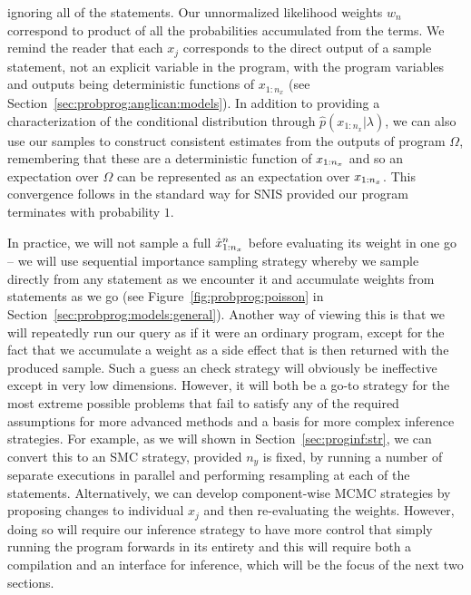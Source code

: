 ignoring all of the \observe statements.  Our unnormalized likelihood weights $w_n$ correspond to
product of all the probabilities accumulated from the \observe terms.  We remind the reader that each 
$x_j$ corresponds to the direct output of a sample statement, not an explicit variable in the program, 
with the program variables and outputs being deterministic functions of $x_{1:n_x}$ (see 
Section~\ref{sec:probprog:anglican:models}). In addition to providing a 
characterization of the conditional distribution through $\hat{p}(x_{1:n_x} | \lambda)$, we can also
use our samples to construct consistent estimates from the outputs of program $\Omega$, remembering
that these are a deterministic function of $x_{1:n_x}$ and so an expectation over $\Omega$ can be
represented as an expectation over $x_{1:n_x}$.
This convergence follows in the standard way for SNIS provided our program terminates with probability $1$.

In practice, we will not sample a full $\hat{x}_{1:n_x}^n$ before evaluating its weight in one go -- we will use
sequential importance sampling strategy whereby we sample directly from any \sample statement as we encounter it
and accumulate weights from \observe statements as we go (see Figure~\ref{fig:probprog:poisson} in
Section~\ref{sec:probprog:models:general}).
Another way of viewing this is that we will repeatedly run our query as if it were an ordinary
program, except for the fact that we accumulate a weight as a side effect that is then returned with
the produced sample.  Such a guess an check strategy will obviously be ineffective except in very low
dimensions.  However, it will both be a go-to strategy for the most extreme possible problems that
fail to satisfy any of the required assumptions for more advanced methods and a basis for more complex 
inference strategies.  For example, as we will shown in Section~\ref{sec:proginf:str}, we can
convert this to an SMC strategy, provided $n_y$ is fixed, by running a number of separate executions
in parallel and performing resampling at each of the \observe statements.  Alternatively, we can
develop component-wise MCMC strategies by proposing changes to individual $x_j$ and then
re-evaluating the weights.  However, doing so will require our inference strategy to have more
control that simply running the program forwards in its entirety and this will require both a compilation
and an interface for inference, which will be the focus of the next two sections.